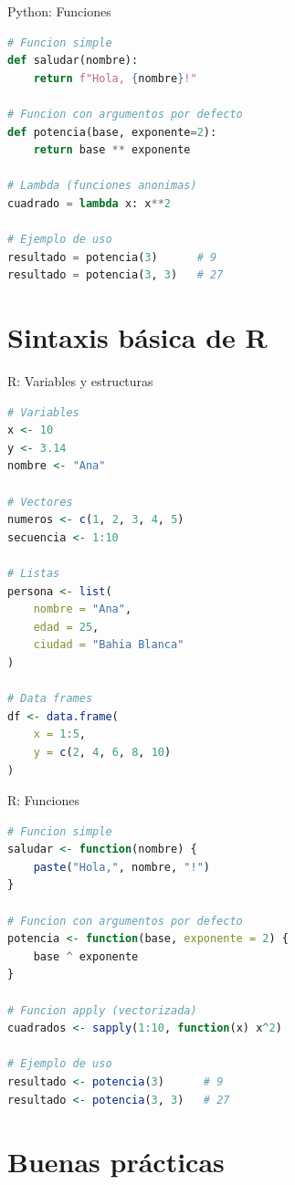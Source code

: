 \documentclass[aspectratio=169]{beamer}
\begin{document}
\begin{frame}[fragile]{Python: Funciones}
\begin{lstlisting}[language=Python]
# Funcion simple
def saludar(nombre):
    return f"Hola, {nombre}!"

# Funcion con argumentos por defecto
def potencia(base, exponente=2):
    return base ** exponente

# Lambda (funciones anonimas)
cuadrado = lambda x: x**2

# Ejemplo de uso
resultado = potencia(3)      # 9
resultado = potencia(3, 3)   # 27
\end{lstlisting}
\end{frame}

\section{Sintaxis básica de R}

\begin{frame}[fragile]{R: Variables y estructuras}
\begin{lstlisting}[language=R]
# Variables
x <- 10
y <- 3.14
nombre <- "Ana"

# Vectores
numeros <- c(1, 2, 3, 4, 5)
secuencia <- 1:10

# Listas
persona <- list(
    nombre = "Ana",
    edad = 25,
    ciudad = "Bahia Blanca"
)

# Data frames
df <- data.frame(
    x = 1:5,
    y = c(2, 4, 6, 8, 10)
)
\end{lstlisting}
\end{frame}

\begin{frame}[fragile]{R: Funciones}
\begin{lstlisting}[language=R]
# Funcion simple
saludar <- function(nombre) {
    paste("Hola,", nombre, "!")
}

# Funcion con argumentos por defecto
potencia <- function(base, exponente = 2) {
    base ^ exponente
}

# Funcion apply (vectorizada)
cuadrados <- sapply(1:10, function(x) x^2)

# Ejemplo de uso
resultado <- potencia(3)      # 9
resultado <- potencia(3, 3)   # 27
\end{lstlisting}
\end{frame}

\section{Buenas prácticas}
\end{document}
